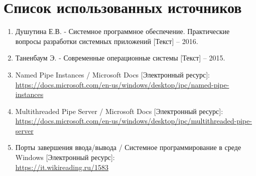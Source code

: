 \section*{Список использованных источников}

\begin{enumerate}
	\item Душутина Е.В. - Системное программное обеспечение. Практические вопросы разработки системных приложений [Текст] -- 2016.
	\item Таненбаум Э. - Современные операционные системы [Текст] -- 2015.
	\item Named Pipe Instances / Microsoft Docs [Электронный ресурс]:\\
		{\small\url{https://docs.microsoft.com/en-us/windows/desktop/ipc/named-pipe-instances}} 
	\item Multithreaded Pipe Server / Microsoft Docs [Электронный ресурс]:\\
		{\small\url{https://docs.microsoft.com/en-us/windows/desktop/ipc/multithreaded-pipe-server}} 
	\item Порты завершения ввода/вывода / Системное программирование в среде Windows [Электронный ресурс]:\\
		{\small\url{https://it.wikireading.ru/1583}} 
\end{enumerate}


